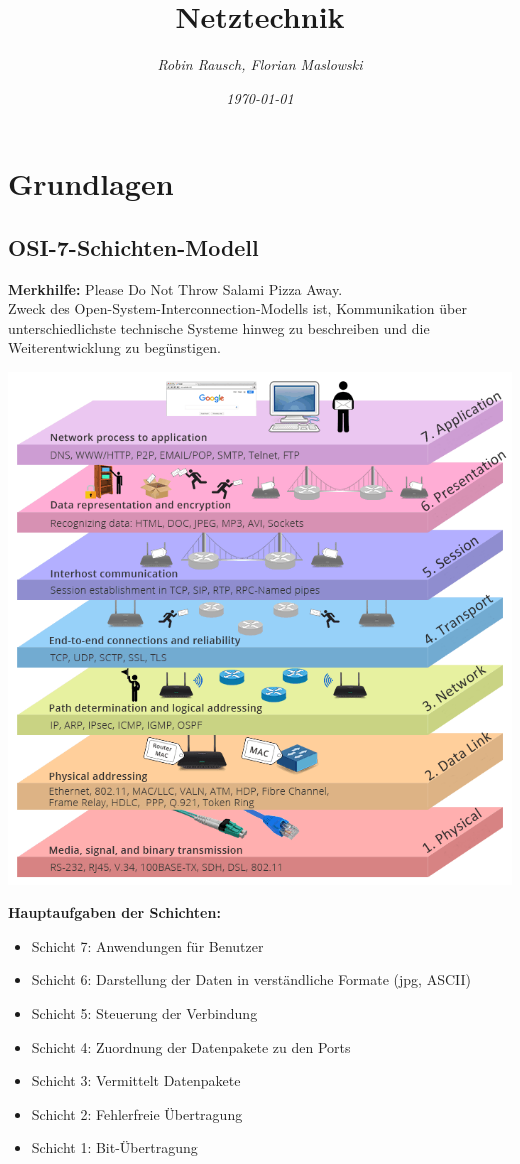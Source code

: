 \documentclass[12pt,a4paper]{article}
\title{Netztechnik}
\author{\slshape Robin Rausch, Florian Maslowski}
\date{\slshape \today}
\begin{document}
	\maketitle
	\tableofcontents
	\newpage
	\section{Grundlagen}
		\subsection{OSI-7-Schichten-Modell}
			\textbf{Merkhilfe:} Please Do Not Throw Salami Pizza Away.\\
			Zweck des Open-System-Interconnection-Modells ist, Kommunikation über unterschiedlichste technische Systeme hinweg zu beschreiben und die Weiterentwicklung zu begünstigen.\newline\newline
			\begin{minipage}{.5\textwidth}
				\includegraphics[scale=.45]{Bilder/OSI-Modell1} %
			\end{minipage}
			\begin{minipage}{.5\textwidth}
				\textbf{Hauptaufgaben der Schichten:}
				\begin{itemize}
					\item Schicht 7: Anwendungen für Benutzer
					\item Schicht 6: Darstellung der Daten in verständliche Formate (jpg, ASCII)
					\item Schicht 5: Steuerung der Verbindung
					\item Schicht 4: Zuordnung der Datenpakete zu den Ports
					\item Schicht 3: Vermittelt Datenpakete
					\item Schicht 2: Fehlerfreie Übertragung
					\item Schicht 1: Bit-Übertragung 
				\end{itemize}
			\end{minipage}
\end{document}

